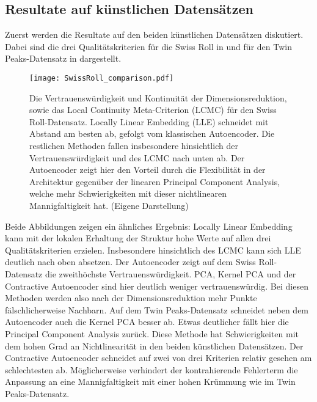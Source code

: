 \subsection{Resultate auf künstlichen Datensätzen}
\label{ch:Vergleich:sec:Resultate:kuenstlich}

Zuerst werden die Resultate auf den beiden künstlichen Datensätzen diskutiert. Dabei sind die drei
Qualitätskriterien für die Swiss Roll in  und für den Twin
Peaks-Datensatz in  dargestellt.
\begin{figure}[ht]
	\begin{center}
		\texttt{[image: SwissRoll\_comparison.pdf]}
	\end{center}
	\caption[Qualitätskriterien für den Swiss Roll-Datensatz]{Die Vertrauenswürdigkeit und Kontinuität der Dimensionsreduktion, sowie das Local Continuity Meta-Criterion (LCMC) für den Swiss Roll-Datensatz. Locally Linear Embedding (LLE) schneidet mit Abstand am besten ab, gefolgt vom klassischen Autoencoder. Die restlichen Methoden fallen insbesondere hinsichtlich der Vertrauenswürdigkeit und des LCMC nach unten ab. Der Autoencoder zeigt hier den Vorteil durch die Flexibilität in der Architektur gegenüber der linearen Principal Component Analysis, welche mehr Schwierigkeiten mit dieser nichtlinearen Mannigfaltigkeit hat. (Eigene Darstellung)}
	\label{fig:SwissRollMetrics}
\end{figure}
Beide Abbildungen zeigen ein ähnliches Ergebnis: Locally Linear Embedding kann mit der lokalen Erhaltung der Struktur hohe Werte auf allen drei Qualitätskriterien erzielen. Insbesondere hinsichtlich des LCMC kann sich LLE deutlich nach oben absetzen.
Der Autoencoder zeigt auf dem Swiss Roll-Datensatz die zweithöchste Vertrauenswürdigkeit. PCA, Kernel PCA und der Contractive Autoencoder sind hier deutlich weniger vertrauenswürdig. Bei diesen Methoden werden also nach der Dimensionsreduktion mehr Punkte fälschlicherweise Nachbarn. Auf dem Twin Peaks-Datensatz schneidet neben dem Autoencoder auch die Kernel PCA besser ab. Etwas deutlicher fällt hier die Principal Component Analysis zurück. Diese Methode hat Schwierigkeiten mit dem hohen Grad an Nichtlinearität in den beiden künstlichen Datensätzen. Der Contractive Autoencoder schneidet auf zwei von drei Kriterien relativ gesehen am schlechtesten ab. Möglicherweise verhindert der kontrahierende Fehlerterm die Anpassung an eine Mannigfaltigkeit mit einer hohen Krümmung wie im Twin Peaks-Datensatz.

